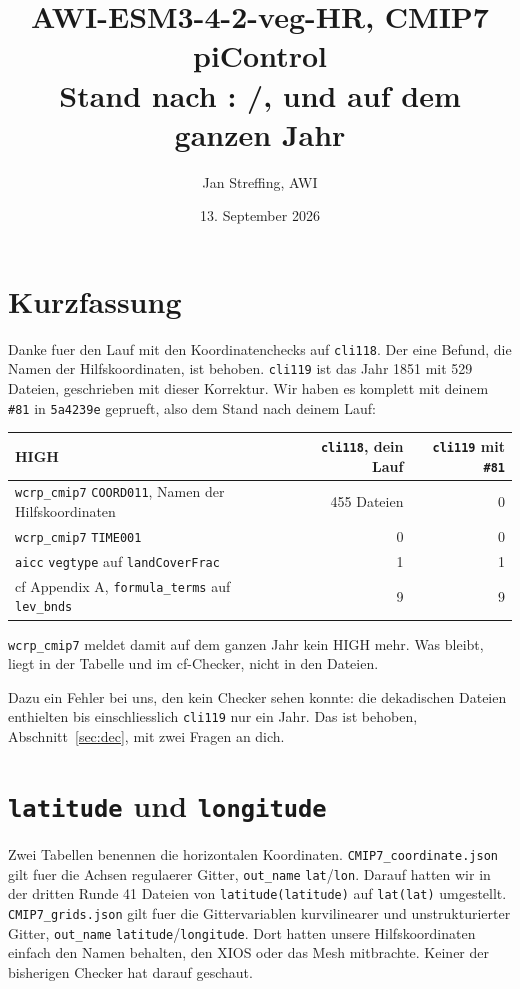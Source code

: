 \documentclass[11pt,a4paper]{article}
\title{AWI-ESM3-4-2-veg-HR, CMIP7 piControl\\[2mm]
\large Stand nach \code{cli119}: \code{latitude}/\code{longitude}, und \code{\#81} auf dem ganzen Jahr}
\author{Jan Streffing, AWI}
\date{13. September 2026}
\newcommand{\code}[1]{\texttt{\small #1}}
\begin{document}
\maketitle

\section{Kurzfassung}

Danke fuer den Lauf mit den Koordinatenchecks auf \code{cli118}. Der eine Befund,
die Namen der Hilfskoordinaten, ist behoben. \code{cli119} ist das Jahr 1851 mit
529 Dateien, geschrieben mit dieser Korrektur. Wir haben es komplett mit deinem
\code{\#81} in \code{5a4239e} geprueft, also dem Stand nach deinem Lauf:

\begin{center}
\begin{tabular}{lrr}
\toprule
\textbf{HIGH} & \textbf{\code{cli118}, dein Lauf} & \textbf{\code{cli119} mit \code{\#81}} \\
\midrule
\code{wcrp\_cmip7} \code{COORD011}, Namen der Hilfskoordinaten & 455 Dateien & 0 \\
\code{wcrp\_cmip7} \code{TIME001}                  & 0 & 0 \\
\code{aicc} \code{vegtype} auf \code{landCoverFrac} & 1 & 1 \\
cf Appendix A, \code{formula\_terms} auf \code{lev\_bnds} & 9 & 9 \\
\bottomrule
\end{tabular}
\end{center}

\code{wcrp\_cmip7} meldet damit auf dem ganzen Jahr kein HIGH mehr. Was bleibt,
liegt in der Tabelle und im cf-Checker, nicht in den Dateien.

Dazu ein Fehler bei uns, den kein Checker sehen konnte: die dekadischen Dateien
enthielten bis einschliesslich \code{cli119} nur ein Jahr. Das ist behoben,
Abschnitt~\ref{sec:dec}, mit zwei Fragen an dich.

\section{\code{latitude} und \code{longitude}}

Zwei Tabellen benennen die horizontalen Koordinaten. \code{CMIP7\_coordinate.json}
gilt fuer die Achsen regulaerer Gitter, \code{out\_name} \code{lat}/\code{lon}.
Darauf hatten wir in der dritten Runde 41 Dateien von \code{latitude(latitude)} auf
\code{lat(lat)} umgestellt. \code{CMIP7\_grids.json} gilt fuer die Gittervariablen
kurvilinearer und unstrukturierter Gitter, \code{out\_name}
\code{latitude}/\code{longitude}. Dort hatten unsere Hilfskoordinaten einfach den
Namen behalten, den XIOS oder das Mesh mitbrachte. Keiner der bisherigen Checker hat
darauf geschaut.
\end{document}
